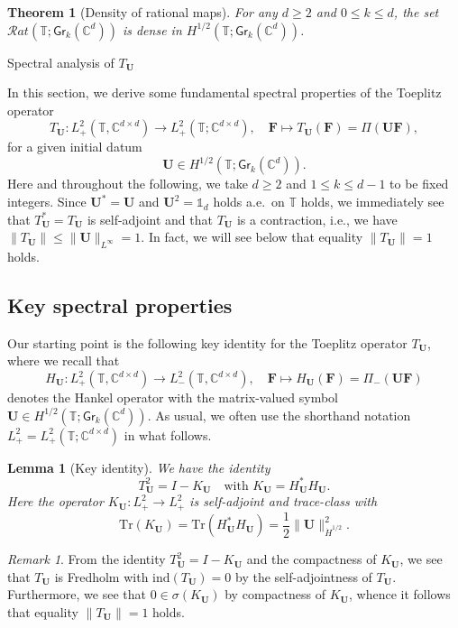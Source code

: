\documentclass[10pt,reqno,a4paper]{amsart}
\makeatletter
\newtheorem{lem}{Lemma}[section]
\newtheorem{thm}{Theorem}[section]
\theoremstyle{definition}
\theoremstyle{remark}
\theoremstyle{remark}
\newtheorem*{remark*}{Remark}
\numberwithin{equation}{section}
\newcommand{\C}{\mathbb{C}}
\newcommand{\T}{\mathbb{T}}
\newcommand{\Cd}{\mathbb{C}^{d \times d}}
\newcommand{\Ub}{\mathbf{U}}
\newcommand{\Fb}{\mathbf{F}}
\newcommand{\id}{I}
\newcommand{\Tr}{\mathrm{Tr}}
\newcommand{\Gr}{\mathsf{Gr}}
\def\section{\@startsection{section}{1}%
  \z@{1.5\linespacing\@plus\linespacing}{.5\linespacing}%
  {\normalfont\bfseries\large\centering}}
\makeatother
\begin{document}
\begin{thm}[Density of rational maps] \label{thm:dense}
For any $d \geq 2$ and $0 \leq k \leq d$, the set $\mathcal{R}at(\T; \Gr_k(\C^d))$ is dense in $H^{1/2}(\T; \Gr_k(\C^d))$.
\end{thm}

\section{Spectral analysis of $T_\Ub$}

\label{sec:spec}

In this section, we derive some fundamental spectral properties of the Toeplitz operator
$$
T_\Ub : L^2_+(\T, \Cd) \to L^2_+(\T; \Cd), \quad \Fb \mapsto T_\Ub(\Fb) = \Pi(\Ub \Fb),
$$ 
for a given initial datum 
$$
\Ub \in H^{1/2}(\T; \Gr_k(\C^d)).
$$
Here and throughout the following, we take $d \geq 2$ and $1 \leq k \leq d-1$ to be fixed integers. Since $\Ub^* = \Ub$ and $\Ub^2 = \mathds{1}_d$ holds a.e.~on $\T$ holds, we immediately see that $T_{\Ub}^* = T_{\Ub}$ is self-adjoint and that $T_\Ub$ is a contraction, i.e., we have $\| T_{\Ub} \| \leq \| \Ub \|_{L^\infty} = 1$.  In fact, we will see below that equality $\|T_\Ub \| = 1$ holds.

 
\subsection{Key spectral properties}

Our starting point is the following key identity for the Toeplitz operator $T_\Ub$, where we recall that 
$$
H_\Ub : L^2_+(\T, \Cd) \to L^2_-(\T, \Cd), \quad \Fb \mapsto H_\Ub(\Fb) = \Pi_-(\Ub \Fb)
$$
denotes the Hankel operator with the matrix-valued symbol $\Ub \in H^{1/2}(\T; \Gr_k(\C^d))$. As usual, we often use the shorthand notation $L^2_+ = L^2_+(\T; \Cd)$ in what follows.

\begin{lem}[Key identity] \label{lem:key_identity}
We have the identity
$$
T_{\Ub}^2 = \id - K_{\Ub} \quad \mbox{with $K_{\Ub} = H_{\Ub}^* H_{\Ub}$}.
$$
Here the operator $K_\Ub : L^2_+ \to L^2_+$ is self-adjoint and trace-class with
$$
\Tr (K_{\Ub}) = \Tr ( H_{\Ub}^* H_\Ub)= \frac{1}{2} \| \Ub \|_{\dot{H}^{1/2}}^2.
$$
\end{lem}

\begin{remark*}
From the identity $T_{\Ub}^2 = \id - K_\Ub$ and the compactness of $K_\Ub$, we see that $T_\Ub$ is Fredholm with $\mathrm{ind} (T_\Ub) = 0$ by the self-adjointness of $T_\Ub$. Furthermore, we see that $0 \in \sigma(K_\Ub)$ by compactness of $K_\Ub$, whence it follows that equality $\| T_\Ub \| = 1$ holds.
\end{remark*}
\end{document}
